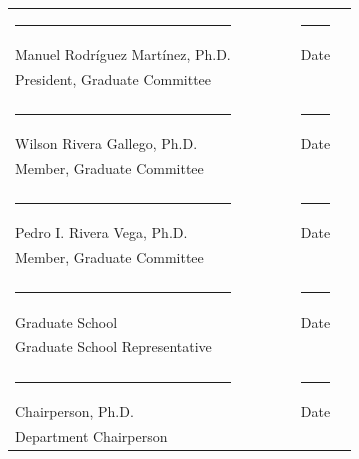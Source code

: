 \documentclass[12pt]{report}
\begin{document}
\begin{titlepage}
\begin{tabular}{l c c c c c r}
			\rule{2.5in}{.1pt} & & & &  &\rule{2in}{.1pt}\\
			Manuel Rodr\'iguez Mart\'inez, Ph.D. & & & &  &Date\\
			President, Graduate Committee\\
			\vspace{.3cm}\\
			\rule{2.5in}{.1pt}& & & &  &\rule{2in}{.1pt}\\
			Wilson Rivera Gallego, Ph.D. & & & &  &Date\\
			Member, Graduate Committee\\
			\vspace{.3cm}\\
			\rule{2.5in}{.1pt} & & & &  &\rule{2in}{.1pt}\\
			Pedro I. Rivera Vega, Ph.D. & & & &  &Date\\
			Member, Graduate Committee\\
			\vspace{.45cm}\\
			\rule{2.5in}{.1pt} & & & &  &\rule{2in}{.1pt}\\
			Graduate School & & & &  &Date\\
			Graduate School Representative\\
			\vspace{.45cm}\\
			\rule{2.5in}{.1pt} & & & &  &\rule{2in}{.1pt}\\
			Chairperson, Ph.D. & & & &  &Date\\
			Department Chairperson \\
		\end{tabular}
	\end{titlepage}
	
	\setcounter{page}{2}
	
\end{document}
